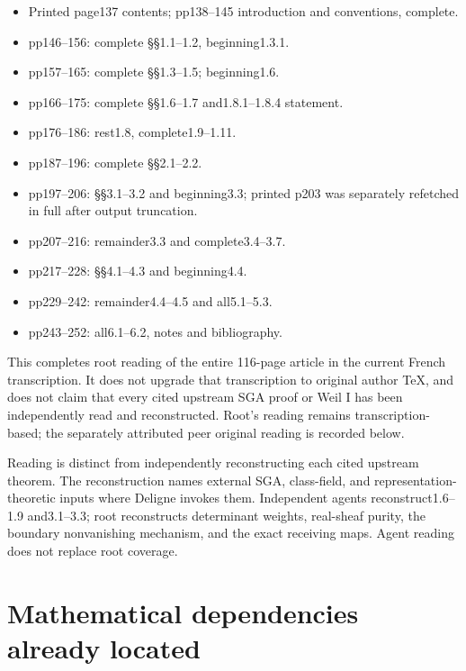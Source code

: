 \documentclass[
]{report}
\providecommand{\tightlist}{%
  \setlength{\itemsep}{0pt}\setlength{\parskip}{0pt}}
\begin{document}
\begin{itemize}
\tightlist
\item
  Printed page137 contents; pp138--145 introduction and conventions,
  complete.
\item
  pp146--156: complete §§1.1--1.2, beginning1.3.1.
\item
  pp157--165: complete §§1.3--1.5; beginning1.6.
\item
  pp166--175: complete §§1.6--1.7 and1.8.1--1.8.4 statement.
\item
  pp176--186: rest1.8, complete1.9--1.11.
\item
  pp187--196: complete §§2.1--2.2.
\item
  pp197--206: §§3.1--3.2 and beginning3.3; printed p203 was separately
  refetched in full after output truncation.
\item
  pp207--216: remainder3.3 and complete3.4--3.7.
\item
  pp217--228: §§4.1--4.3 and beginning4.4.
\item
  pp229--242: remainder4.4--4.5 and all5.1--5.3.
\item
  pp243--252: all6.1--6.2, notes and bibliography.
\end{itemize}

This completes root reading of the entire 116-page article in the
current French transcription. It does not upgrade that transcription to
original author TeX, and does not claim that every cited upstream SGA
proof or Weil I has been independently read and reconstructed. Root's
reading remains transcription-based; the separately attributed peer
original reading is recorded below.

Reading is distinct from independently reconstructing each cited
upstream theorem. The reconstruction names external SGA, class-field,
and representation-theoretic inputs where Deligne invokes them.
Independent agents reconstruct1.6--1.9 and3.1--3.3; root reconstructs
determinant weights, real-sheaf purity, the boundary nonvanishing
mechanism, and the exact receiving maps. Agent reading does not replace
root coverage.

\section{Mathematical dependencies already
located}\label{mathematical-dependencies-already-located}
\end{document}
